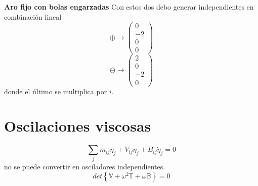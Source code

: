 \documentclass[10pt,oneside]{CBFT_book}
\begin{document}
\begin{ejemplo}{\bf Aro fijo con bolas engarzadas}
Con estos dos debo generar independientes en combinación lineal
\[
	\oplus \to  \begin{pmatrix}
	 0 \\
	 -2 \\
	 0 \\
	 0
	\end{pmatrix}
\]
\[
	\ominus \to \begin{pmatrix}
	 2 \\
	 0 \\
	 -2 \\
	 0
	\end{pmatrix}
\]
donde el último se multiplica por $i$.

\end{ejemplo}




\section{Oscilaciones viscosas}

\[
	\sum_j m_{ij} \ddot{\eta}_j + V_{ij}\eta_j + B_{ij}\dot{\eta}_j = 0
\]
no se puede convertir en osciladores independientes.
\[
	det\left\{ \mathbb{V} + \omega^2 \mathbb{T} + \omega \mathbb{B}\right\} = 0
\]
\end{document}
